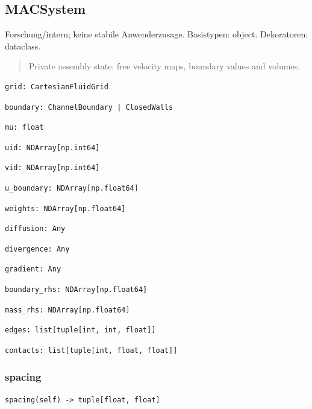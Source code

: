 \subsection{MACSystem}
Forschung/intern; keine stabile Anwenderzusage.
Basistypen: object. Dekoratoren: dataclass.
\begin{quote}
Private assembly state: free velocity maps, boundary values and volumes.
\end{quote}
\begin{lstlisting}
grid: CartesianFluidGrid
\end{lstlisting}
\begin{lstlisting}
boundary: ChannelBoundary | ClosedWalls
\end{lstlisting}
\begin{lstlisting}
mu: float
\end{lstlisting}
\begin{lstlisting}
uid: NDArray[np.int64]
\end{lstlisting}
\begin{lstlisting}
vid: NDArray[np.int64]
\end{lstlisting}
\begin{lstlisting}
u_boundary: NDArray[np.float64]
\end{lstlisting}
\begin{lstlisting}
weights: NDArray[np.float64]
\end{lstlisting}
\begin{lstlisting}
diffusion: Any
\end{lstlisting}
\begin{lstlisting}
divergence: Any
\end{lstlisting}
\begin{lstlisting}
gradient: Any
\end{lstlisting}
\begin{lstlisting}
boundary_rhs: NDArray[np.float64]
\end{lstlisting}
\begin{lstlisting}
mass_rhs: NDArray[np.float64]
\end{lstlisting}
\begin{lstlisting}
edges: list[tuple[int, int, float]]
\end{lstlisting}
\begin{lstlisting}
contacts: list[tuple[int, float, float]]
\end{lstlisting}
\subsubsection*{spacing}
\begin{lstlisting}
spacing(self) -> tuple[float, float]
\end{lstlisting}

